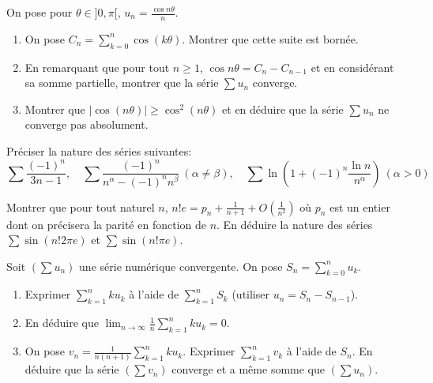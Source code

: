 \begin{exercice}
On pose pour $\theta\in]0,\pi[$, $u_{n}=\frac{\cos n\theta}{n}$.
\begin{enumerate}
    \item On pose $C_{n}=\sum_{k=0}^{n}\cos(k\theta)$. Montrer que cette suite est bornée.
    \item En remarquant que pour tout $n\ge1$, $\cos n\theta=C_{n}-C_{n-1}$ et en considérant sa somme partielle, montrer que la série $\sum u_{n}$ converge.
    \item Montrer que $|\cos(n\theta)|\ge \cos^{2}(n\theta)$ et en déduire que la série $\sum u_{n}$ ne converge pas absolument.
\end{enumerate}
\end{exercice}

\begin{exercice}
Préciser la nature des séries suivantes:
$$ \sum\frac{(-1)^{n}}{3n-1}, \quad \sum\frac{(-1)^{n}}{n^{\alpha}-(-1)^{n}n^{\beta}} \ (\alpha\ne\beta), \quad \sum \ln\left(1+(-1)^{n}\frac{\ln n}{n^{\alpha}}\right) \ (\alpha>0) $$

\end{exercice}

\begin{exercice}
Montrer que pour tout naturel $n$, $n!e=p_{n}+\frac{1}{n+1}+O(\frac{1}{n^{2}})$ où $p_{n}$ est un entier dont on précisera la parité en fonction de $n$.
En déduire la nature des séries $\sum \sin(n!2\pi e)$ et $\sum \sin(n!\pi e)$.
\end{exercice}

\begin{exercice}
Soit $(\sum u_{n})$ une série numérique convergente. On pose $S_{n}=\sum_{k=0}^{n}u_{k}$.
\begin{enumerate}
    \item Exprimer $\sum_{k=1}^{n}ku_{k}$ à l'aide de $\sum_{k=1}^{n}S_{k}$ (utiliser $u_n = S_n - S_{n-1}$).
    \item En déduire que $\lim_{n\rightarrow\infty}\frac{1}{n}\sum_{k=1}^{n}ku_{k}=0$.
    \item On pose $v_{n}=\frac{1}{n(n+1)}\sum_{k=1}^{n}ku_{k}$. Exprimer $\sum_{k=1}^{n}v_{k}$ à l'aide de $S_{n}$. En déduire que la série $(\sum v_{n})$ converge et a même somme que $(\sum u_{n})$.
\end{enumerate}
\end{exercice}

